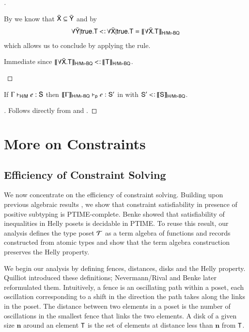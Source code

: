 \documentclass{report}
\begin{document}
\begin{proof}[]
\begin{indcase}{\mlgen}
      By  we know that $\bar{\textsf{X}}\subseteq\bar{\textsf{Y}}$
      and by 
      \begin{displaymath}
        \forall\bar{\type{Y}}|\true.\type{T}\subtype
        \forall\bar{\type{X}}|\true.\type{T}=
        \mltobq{\forall\bar{\type{X}}.\type{T}}
      \end{displaymath}
      which allows us to conclude by applying the \decsub rule.
    \end{indcase}
    \begin{indcase}{\mlinst}
      Immediate since $\mltobq{\forall\bar{\type{X}}.\type{T}}\subtype\mltobq{\type{T}}$.
    \end{indcase}
  \end{proof}
  \begin{thm}
    If $\Gamma\vdash_\textsf{H/M} e:\textsf{S}$ then $\llbracket{\Gamma}\rrbracket_{\textsf{H/M}\rhd\textsf{BQ}}\vdash_\textsf{p} e:\textsf{S}'$ in \BQ with
    $\type{S}'\subtype\mltobq{\type{S}}$.
  \end{thm}
  \begin{proof}[]
    Follows directly from  and .
  \end{proof}
  
  \chapter{More on Constraints}
  \section{Efficiency of Constraint Solving}
  We now concentrate on the efficiency of constraint solving.
  Building upon previous algebraic results \cite{benke93,pratt96satisfiability,tiuryn92},
  we show that constraint satisfiability in presence of positive subtyping is PTIME-complete.
  Benke \cite{benke93}
  showed that satisfiability of inequalities in Helly posets  is decidable in PTIME.
  To reuse this result, our analysis defines the type poset $\mathcal{T}$ as a term algebra of functions
  and records constructed from atomic types  and show that the term algebra
  construction preserves the Helly property.
    
  We begin our analysis by defining fences, distances, disks and
  the Helly property. Quilliot \cite{appofhelly} introduced these definitions;
  Nevermann/Rival \cite{holes} and Benke \cite{benke93} later reformulated them.
  Intuitively, a fence is an oscillating path within a poset, each
  oscillation corresponding to a shift in the direction the path takes  
  along the links in the poset.
  The distance between two elements in a
  poset is the number of oscillations in the smallest fence that links  
  the two elements.
  A disk of a given size $\mathbf{n}$ around an element $\textsf{T}$ is the set of
  elements at distance less than $\mathbf{n}$ from $\textsf{T}$.
  
\end{document}
